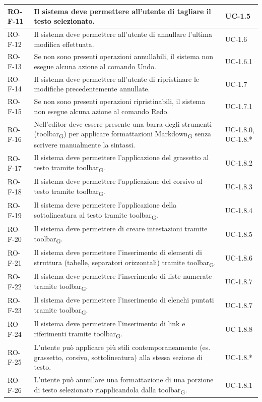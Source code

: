 \documentclass[11pt,a4paper]{article}
\newcommand{\gls}[1]{#1\textsubscript{G}}
\begin{document}
\begin{longtable}{|p{}|>{\raggedright\arraybackslash}p{}|p{}|}
\hline
RO-F-11 & Il sistema deve permettere all'utente di tagliare il testo selezionato. & UC-1.5 \\
\hline
RO-F-12 & Il sistema deve permettere all'utente di annullare l'ultima modifica effettuata. & UC-1.6 \\
\hline
RO-F-13 & Se non sono presenti operazioni annullabili, il sistema non esegue alcuna azione al comando Undo. & UC-1.6.1 \\
\hline
RO-F-14 & Il sistema deve permettere all'utente di ripristinare le modifiche precedentemente annullate. & UC-1.7 \\
\hline
RO-F-15 & Se non sono presenti operazioni ripristinabili, il sistema non esegue alcuna azione al comando Redo. & UC-1.7.1 \\
\hline
RO-F-16 & Nell'editor deve essere presente una barra degli strumenti (\gls{toolbar}) per applicare formattazioni \gls{Markdown} senza scrivere manualmente la sintassi. & UC-1.8.0, UC-1.8.* \\
\hline
RO-F-17 & Il sistema deve permettere l'applicazione del grassetto al testo tramite \gls{toolbar}. & UC-1.8.2 \\
\hline
RO-F-18 & Il sistema deve permettere l'applicazione del corsivo al testo tramite \gls{toolbar}. & UC-1.8.3 \\
\hline
RO-F-19 & Il sistema deve permettere l'applicazione della sottolineatura al testo tramite \gls{toolbar}. & UC-1.8.4 \\
\hline
RO-F-20 & Il sistema deve permettere di creare intestazioni tramite \gls{toolbar}. & UC-1.8.5 \\
\hline
RO-F-21 & Il sistema deve permettere l'inserimento di elementi di struttura (tabelle, separatori orizzontali) tramite \gls{toolbar}. & UC-1.8.6 \\
\hline
RO-F-22 & Il sistema deve permettere l'inserimento di liste numerate tramite \gls{toolbar}. & UC-1.8.7 \\
\hline
RO-F-23 & Il sistema deve permettere l'inserimento di elenchi puntati tramite \gls{toolbar}. & UC-1.8.7 \\
\hline
RO-F-24 & Il sistema deve permettere l'inserimento di link e riferimenti tramite \gls{toolbar}. & UC-1.8.8 \\
\hline
RO-F-25 & L'utente può applicare più stili contemporaneamente (es. grassetto, corsivo, sottolineatura) alla stessa sezione di testo. & UC-1.8.* \\
\hline
RO-F-26 & L'utente può annullare una formattazione di una porzione di testo selezionato riapplicandola dalla \gls{toolbar}. & UC-1.8.1 \\

\end{longtable}
\end{document}
